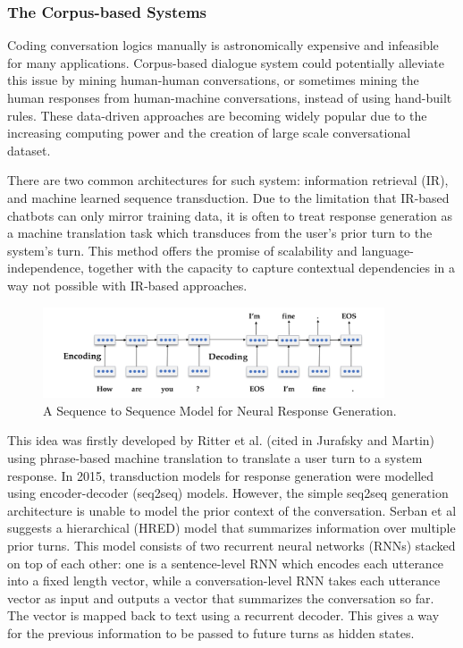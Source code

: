 \documentclass[bsc,frontabs,twoside,singlespacing,parskip,deptreport]{infthesis}     %
\begin{document}
\subsubsection*{The Corpus-based Systems}

Coding conversation logics manually is astronomically expensive and infeasible for many applications. Corpus-based dialogue system could potentially alleviate this issue by mining human-human conversations, or sometimes mining the human responses from human-machine conversations, instead of using hand-built rules. These data-driven approaches are becoming widely popular due to the increasing computing power and the creation of large scale conversational dataset. 

There are two common architectures for such system: information retrieval (IR), and machine learned sequence transduction. Due to the limitation that IR-based chatbots can only mirror training data, it is often to treat response generation as a machine translation task which transduces from the user’s prior turn to the system’s turn. This method offers the promise of scalability and language-independence, together with the capacity to capture contextual dependencies in a way not possible with IR-based approaches.

\begin{figure}[h]
    \centering
    \includegraphics[width=0.9\textwidth]{seq2seq.jpeg}
    \caption{A Sequence to Sequence Model for Neural Response Generation.\cite{jurafsky2019speech}}
    \label{fig:seq2seq}
\end{figure}

This idea was firstly developed by Ritter et al\cite{ritter2011data}. (cited in Jurafsky and Martin\cite{jurafsky2019speech}) using phrase-based machine translation to translate a user turn to a system response. In 2015, transduction models for response generation were modelled using encoder-decoder (seq2seq) models\cite{shang2015neural,strub2017end,sordoni2015neural}. However, the simple seq2seq generation architecture is unable to model the prior context of the conversation. Serban et al\cite{serban2016building} suggests a hierarchical (HRED) model that summarizes information over multiple prior turns. This model consists of two recurrent neural networks (RNNs) stacked on top of each other: one is a sentence-level RNN which encodes each utterance into a fixed length vector, while a conversation-level RNN takes each utterance vector as input and outputs a vector that summarizes the conversation so far. The vector is mapped back to text using a recurrent decoder. This gives a way for the previous information to be passed to future turns as hidden states\cite{lowe2017training}.
\end{document}

